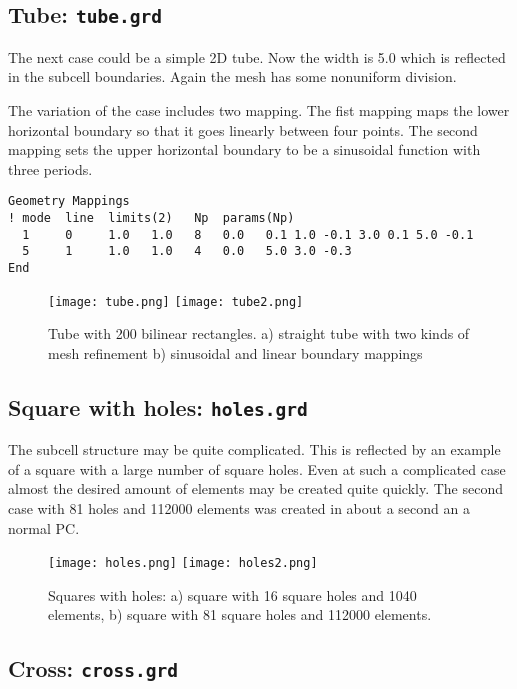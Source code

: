 \subsection*{Tube: \texttt{tube.grd}}

The next case could be a simple 2D tube. 
Now the width is 5.0 which is reflected in 
the subcell boundaries. Again the mesh has some nonuniform division.

%
The variation of the case includes two mapping. The fist mapping
maps the lower horizontal boundary so that it goes linearly between four points.
The second mapping sets the upper horizontal boundary to be a sinusoidal
function with three periods. 
\begin{verbatim}
Geometry Mappings 
! mode  line  limits(2)   Np  params(Np)
  1     0     1.0   1.0   8   0.0	0.1 1.0 -0.1 3.0 0.1 5.0 -0.1 
  5     1     1.0   1.0   4   0.0	5.0 3.0 -0.3
End 
\end{verbatim}
%
\begin{figure}
\begin{center}
\texttt{[image: tube.png]} 
\texttt{[image: tube2.png]}
\end{center}
\caption{Tube with 200 bilinear rectangles.
a) straight tube with 
two kinds of mesh refinement
b) sinusoidal and linear boundary mappings}
\label{pic3}
\end{figure}

\subsection*{Square with holes: \texttt{holes.grd}}

The subcell structure may be quite complicated. This is reflected by an
example of a square with a large number of square holes. Even at such a complicated
case almost the desired amount of elements may be created quite quickly.
The second case with 81 holes and 112000 elements was created in 
about a second an a normal PC.

%
\begin{figure}
\begin{center}
\texttt{[image: holes.png]}
\texttt{[image: holes2.png]}
\end{center}
\caption{Squares with holes: 
a) square with 16 square holes and 1040 elements,
b) square with 81 square holes and 112000 elements.}
\label{pic5}
\end{figure}


\subsection*{Cross: \texttt{cross.grd}}

